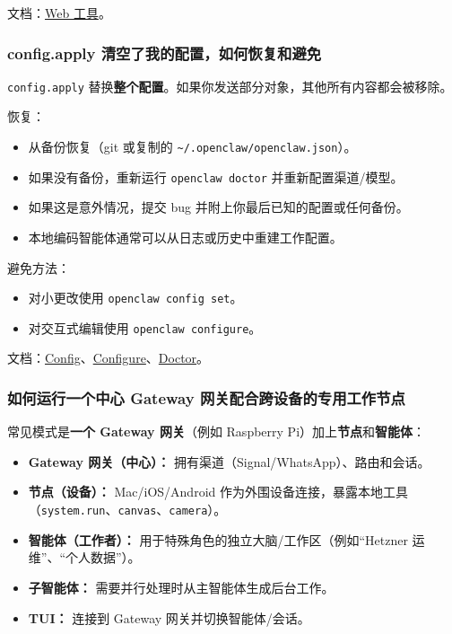 文档：\href{/tools/web}{Web 工具}。

\subsubsection{config.apply 清空了我的配置，如何恢复和避免}


\texttt{config.apply} 替换\textbf{整个配置}。如果你发送部分对象，其他所有内容都会被移除。

恢复：

\begin{itemize}
  \item 从备份恢复（git 或复制的 \texttt{\textasciitilde{}/.openclaw/openclaw.json}）。
  \item 如果没有备份，重新运行 \texttt{openclaw doctor} 并重新配置渠道/模型。
  \item 如果这是意外情况，提交 bug 并附上你最后已知的配置或任何备份。
  \item 本地编码智能体通常可以从日志或历史中重建工作配置。
\end{itemize}


避免方法：

\begin{itemize}
  \item 对小更改使用 \texttt{openclaw config set}。
  \item 对交互式编辑使用 \texttt{openclaw configure}。
\end{itemize}


文档：\href{/cli/config}{Config}、\href{/cli/configure}{Configure}、\href{/gateway/doctor}{Doctor}。

\subsubsection{如何运行一个中心 Gateway 网关配合跨设备的专用工作节点}


常见模式是\textbf{一个 Gateway 网关}（例如 Raspberry Pi）加上\textbf{节点}和\textbf{智能体}：

\begin{itemize}
  \item \textbf{Gateway 网关（中心）：} 拥有渠道（Signal/WhatsApp）、路由和会话。
  \item \textbf{节点（设备）：} Mac/iOS/Android 作为外围设备连接，暴露本地工具（\texttt{system.run}、\texttt{canvas}、\texttt{camera}）。
  \item \textbf{智能体（工作者）：} 用于特殊角色的独立大脑/工作区（例如“Hetzner 运维”、“个人数据”）。
  \item \textbf{子智能体：} 需要并行处理时从主智能体生成后台工作。
  \item \textbf{TUI：} 连接到 Gateway 网关并切换智能体/会话。
\end{itemize}


